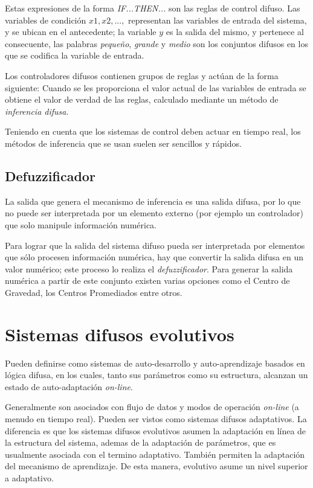 Estas expresiones de la forma \textit{IF...THEN...} son las reglas de control difuso. Las variables de condición $x1, x2, ...,$ representan las variables de entrada del sistema, y se ubican en el antecedente; la variable $y$ es la salida del mismo, y pertenece al consecuente, las palabras \textit{pequeño}, \textit{grande} y \textit{medio} son los conjuntos difusos en los que se codifica la variable de entrada.

Los controladores difusos contienen grupos de reglas y actúan de la forma siguiente: Cuando se les proporciona el valor actual de las variables de entrada se obtiene el valor de verdad de las reglas, calculado mediante un método de \textit{inferencia difusa}. 

Teniendo en cuenta que los sistemas de control deben actuar en tiempo real, los métodos de inferencia que se usan suelen ser sencillos y rápidos.  


\subsection{Defuzzificador}


La salida que genera el mecanismo de inferencia es una salida difusa, por lo que no puede ser interpretada por un elemento externo (por ejemplo un controlador) que solo manipule información numérica. 

Para lograr que la salida del sistema difuso pueda ser interpretada por elementos que sólo procesen información numérica, hay que convertir la salida difusa en un valor numérico; este proceso lo realiza el \textit{defuzzificador}. Para generar la salida numérica a partir de este conjunto existen varias opciones como el Centro de Gravedad, los Centros Promediados entre otros.

\section{Sistemas difusos evolutivos} 
\label{sec:sde}

Pueden definirse como sistemas de auto-desarrollo y auto-aprendizaje basados en lógica difusa, en los cuales, tanto sus parámetros como su estructura, alcanzan un estado de auto-adaptación \textit{on-line}.

Generalmente son asociados con flujo de datos y modos de operación \textit{on-line} (a menudo en tiempo real). Pueden ser vistos como sistemas difusos adaptativos. La diferencia es que los sistemas difusos evolutivos asumen la adaptación en línea de la estructura del sistema, ademas de la adaptación de parámetros, que es usualmente asociada con el termino adaptativo. También permiten la adaptación del mecanismo de aprendizaje. De esta manera, evolutivo asume un nivel superior a adaptativo. 

